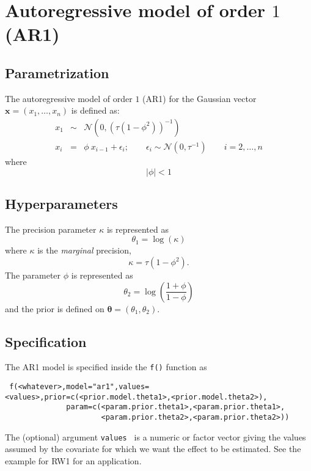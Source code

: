 \documentclass[a4paper,11pt]{article}
\begin{document}
\section*{Autoregressive model of order $1$ (AR1)}

\subsection*{Parametrization}

The autoregressive model of order $1$ (AR1) for the Gaussian vector $\mathbf{x}=(x_1,\dots,x_n)$ is defined as:
\begin{eqnarray}\nonumber
x_1&\sim&\mathcal{N}(0,(\tau(1-\phi^2))^{-1}) \\\nonumber
x_i&=&\phi\ x_{i-1}+\epsilon_i; \qquad \epsilon_i\sim\mathcal{N}(0,\tau^{-1}) \qquad  i=2,\dots,n
\end{eqnarray}
where
\[
|\phi|<1
\]

\subsection*{Hyperparameters}

The precision parameter $\kappa$ is represented as
\begin{displaymath}
    \theta_1 =\log(\kappa) 
\end{displaymath}
where $\kappa$ is the \emph{marginal} precision,
\begin{displaymath}
    \kappa = \tau (1-\phi^{2}).
\end{displaymath}
The parameter $\phi$ is represented as
\[
\theta_2 = \log\left(\frac{1+\phi}{1-\phi}\right)
\]
and the prior is defined on $\mathbf{\theta}=(\theta_1,\theta_2)$. 

\subsection*{Specification}

The AR1 model is specified inside the {\tt f()} function as
\begin{verbatim}
 f(<whatever>,model="ar1",values=<values>,prior=c(<prior.model.theta1>,<prior.model.theta2>),
              param=c(<param.prior.theta1>,<param.prior.theta1>,
                      <param.prior.theta2>,<param.prior.theta2>))
\end{verbatim}
The (optional) argument {\tt values } is a numeric or factor vector giving the values assumed by the covariate for
 which we want the effect to be estimated. See the example for RW1 for an application. 
\end{document}
